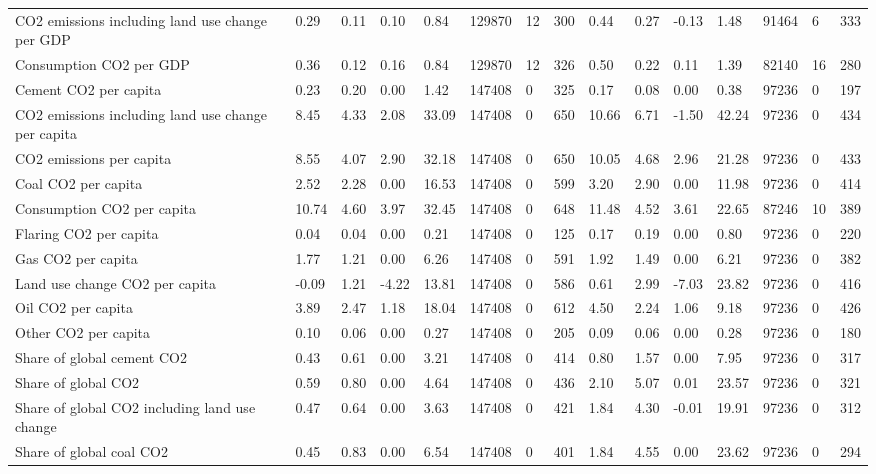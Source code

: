 \begin{longtable}{lllllllllllllll}
CO2 emissions including land use change per GDP & 0.29 & 0.11 & 0.10 & 0.84 & 129870 & 12 & 300 & 0.44 & 0.27 & -0.13 & 1.48 & 91464 & 6 & 333\\
\addlinespace
Consumption CO2 per GDP & 0.36 & 0.12 & 0.16 & 0.84 & 129870 & 12 & 326 & 0.50 & 0.22 & 0.11 & 1.39 & 82140 & 16 & 280\\
Cement CO2 per capita & 0.23 & 0.20 & 0.00 & 1.42 & 147408 & 0 & 325 & 0.17 & 0.08 & 0.00 & 0.38 & 97236 & 0 & 197\\
CO2 emissions including land use change per capita & 8.45 & 4.33 & 2.08 & 33.09 & 147408 & 0 & 650 & 10.66 & 6.71 & -1.50 & 42.24 & 97236 & 0 & 434\\
CO2 emissions per capita & 8.55 & 4.07 & 2.90 & 32.18 & 147408 & 0 & 650 & 10.05 & 4.68 & 2.96 & 21.28 & 97236 & 0 & 433\\
Coal CO2 per capita & 2.52 & 2.28 & 0.00 & 16.53 & 147408 & 0 & 599 & 3.20 & 2.90 & 0.00 & 11.98 & 97236 & 0 & 414\\
\addlinespace
Consumption CO2 per capita & 10.74 & 4.60 & 3.97 & 32.45 & 147408 & 0 & 648 & 11.48 & 4.52 & 3.61 & 22.65 & 87246 & 10 & 389\\
Flaring CO2 per capita & 0.04 & 0.04 & 0.00 & 0.21 & 147408 & 0 & 125 & 0.17 & 0.19 & 0.00 & 0.80 & 97236 & 0 & 220\\
Gas CO2 per capita & 1.77 & 1.21 & 0.00 & 6.26 & 147408 & 0 & 591 & 1.92 & 1.49 & 0.00 & 6.21 & 97236 & 0 & 382\\
Land use change CO2 per capita & -0.09 & 1.21 & -4.22 & 13.81 & 147408 & 0 & 586 & 0.61 & 2.99 & -7.03 & 23.82 & 97236 & 0 & 416\\
Oil CO2 per capita & 3.89 & 2.47 & 1.18 & 18.04 & 147408 & 0 & 612 & 4.50 & 2.24 & 1.06 & 9.18 & 97236 & 0 & 426\\
\addlinespace
Other CO2 per capita & 0.10 & 0.06 & 0.00 & 0.27 & 147408 & 0 & 205 & 0.09 & 0.06 & 0.00 & 0.28 & 97236 & 0 & 180\\
Share of global cement CO2 & 0.43 & 0.61 & 0.00 & 3.21 & 147408 & 0 & 414 & 0.80 & 1.57 & 0.00 & 7.95 & 97236 & 0 & 317\\
Share of global CO2 & 0.59 & 0.80 & 0.00 & 4.64 & 147408 & 0 & 436 & 2.10 & 5.07 & 0.01 & 23.57 & 97236 & 0 & 321\\
Share of global CO2 including land use change & 0.47 & 0.64 & 0.00 & 3.63 & 147408 & 0 & 421 & 1.84 & 4.30 & -0.01 & 19.91 & 97236 & 0 & 312\\
Share of global coal CO2 & 0.45 & 0.83 & 0.00 & 6.54 & 147408 & 0 & 401 & 1.84 & 4.55 & 0.00 & 23.62 & 97236 & 0 & 294\\

\end{longtable}

